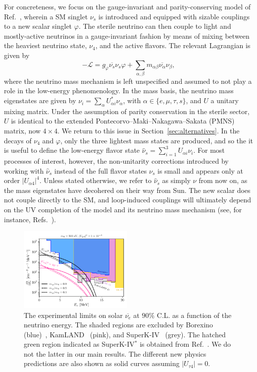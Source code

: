 \documentclass[
reprint,
superscriptaddress,
showpacs,
preprintnumbers,
nofootinbib,
nobibnotes,
amsmath,
amssymb, 
aps,
prd,
floatfix
]{revtex4-1}
\newcommand{\refsec}[1]{Section~\ref{#1}}
\renewcommand{\phi}{\varphi}
\begin{document}
For concreteness, we focus on the gauge-invariant and parity-conserving model of Ref.~\cite{Dentler:2019dhz}, wherein a SM singlet $\nu_s$ is introduced and equipped with sizable couplings to a new scalar singlet $\phi$. The sterile neutrino can then couple to light and mostly-active neutrinos in a gauge-invariant fashion by means of mixing between the heaviest neutrino state, $\nu_4$, and the active flavors. The relevant Lagrangian is given by
\begin{equation}\label{eq:Lscalar}
 - \mathscr{L} = g_\phi \overline{{\nu_s}} {\nu_s} \phi + \sum_{\alpha,\beta} m_{\alpha \beta} \overline{{\nu_\alpha}} {\nu_\beta}, 
\end{equation}
where the neutrino mass mechanism is left unspecified and assumed to not play a role in the low-energy phenomenology. In the mass basis, the neutrino mass eigenstates are given by $\nu_i = \sum_\alpha U_{\alpha i}^* \nu_\alpha$, with $\alpha\in \{e,\mu,\tau,s\}$, and $U$ a unitary mixing matrix. Under the assumption of parity conservation in the sterile sector, $U$ is identical to the extended Pontecorvo–Maki–Nakagawa–Sakata (PMNS) matrix, now $4\times4$. We return to this issue in \refsec{sec:alternatives}. In the decays of $\nu_4$ and $\phi$, only the three lightest mass states are produced, and so the it is useful to define the low-energy flavor state $\hat{\nu}_s = \sum_{i=1}^3 U_{\alpha i} \nu_i$. For most processes of interest, however, the non-unitarity corrections introduced by working with $\hat{\nu}_s$ instead of the full flavor states $\nu_s$ is small and appears only at order $|U_{\alpha4}|^4$. Unless stated otherwise, we refer to $\hat{\nu}_s$ as simply $\nu$ from now on, as the mass eigenstates have decohered on their way from Sun. The new scalar does not couple directly to the SM, and loop-induced couplings will ultimately depend on the UV completion of the model and its neutrino mass mechanism (see, for instance, Refs.~\cite{Chikashige:1980ui,Xu:2020qek}).
%
\begin{figure}[t]
    \centering
    \includegraphics[width=0.49\textwidth]{Fluxlimit_scalar_v2.pdf}
    \caption{The experimental limits on solar $\overline{\nu_e}$ at $90\%$ C.L. as a function of the neutrino energy. The shaded regions are excluded by Borexino (blue)~\cite{Agostini:2019yuq}, KamLAND~\cite{Collaboration:2011jza} (pink), and SuperK-IV~\cite{Super-Kamiokande:2020frs} (grey). The hatched green region indicated as SuperK-IV$^*$ is obtained from Ref.~\cite{Linyan2018}. We do not the latter in our main results. The different new physics predictions are also shown as solid curves assuming $|U_{\tau 4}|=0$. \label{fig:fluxlimits}}
\end{figure}
\end{document}
